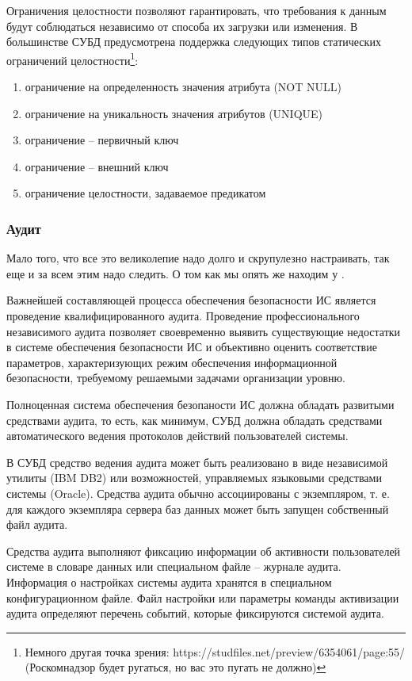 Ограничения целостности позволяют гарантировать, что требования к данным будут соблюдаться независимо от способа их загрузки или изменения. В большинстве СУБД предусмотрена поддержка следующих типов статических ограничений целостности\footnote{Немного другая точка зрения: https://studfiles.net/preview/6354061/page:55/ (Роскомнадзор будет ругаться, но вас это пугать не должно)}:
\begin{enumerate}
	\item ограничение на определенность значения атрибута (NOT NULL)
	\item ограничение на уникальность значения атрибутов (UNIQUE)
	\item ограничение -- первичный ключ
	\item ограничение -- внешний ключ
	\item ограничение целостности, задаваемое предикатом
\end{enumerate}

\subsubsection{Аудит}
Мало того, что все это великолепие надо долго и скрупулезно настраивать, так еще и за всем этим надо следить. О том как мы опять же находим у \autocite{Smirnov2007}.
\begin{grayquote}
	Важнейшей составляющей процесса обеспечения безопасности ИС является проведение квалифицированного аудита. Проведение профессионального независимого аудита позволяет своевременно выявить существующие недостатки в системе обеспечения безопасности ИС и объективно оценить соответствие параметров, характеризующих режим обеспечения информационной безопасности, требуемому решаемыми задачами организации уровню.
\end{grayquote}

Полноценная система обеспечения безопаности ИС должна обладать развитыми средствами аудита, то есть, как минимум, СУБД должна обладать средствами автоматического ведения протоколов действий пользователей системы.

В СУБД средство ведения аудита может быть реализовано в виде независимой утилиты (IBM DB2) или возможностей, управляемых языковыми средствами системы (Oracle). Средства аудита обычно ассоциированы с экземпляром, т. е. для каждого экземпляра сервера баз данных может быть запущен собственный файл аудита.

Средства аудита выполняют фиксацию информации об активности пользователей системе в словаре данных или специальном файле – журнале аудита. Информация о настройках системы аудита хранятся в специальном конфигурационном файле. Файл настройки или параметры команды активизации аудита определяют перечень событий, которые фиксируются системой аудита.

